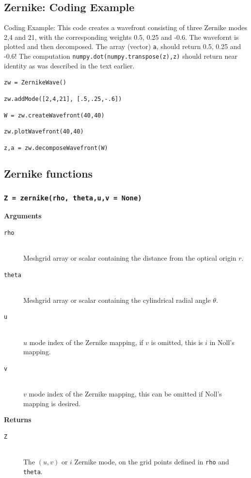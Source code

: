 \documentclass{article}
\begin{document}
\lstset{language=Python} 
\subsection{Zernike: Coding Example}
Coding Example: This code creates a wavefront consisting of three Zernike modes 2,4 and 21, with the corresponding weights 0.5, 0.25 and -0.6. The wavefornt is plotted and then decomposed. The array (vector) \texttt{a}, should return 0.5, 0.25 and -0.6! The computation \texttt{numpy.dot(numpy.transpose(z),z)} should return near identity as was described in the text earlier.

\texttt{zw = ZernikeWave()}

\texttt{zw.addMode([2,4,21], [.5,.25,-.6]) }

\texttt{W = zw.createWavefront(40,40)}

\texttt{zw.plotWavefront(40,40)}

\texttt{z,a = zw.decomposeWavefront(W)}

\newpage
\subsection{Zernike functions}
\subsubsection*{\texttt{Z = zernike(rho, theta,u,v = None)}}
\textbf{Arguments}
\begin{description}
\item[\texttt{rho}]\hfill \\
	Meshgrid array or scalar containing the distance from the optical origin $r$.
\item[\texttt{theta}]\hfill \\
 	Meshgrid array or scalar containing the cylindrical radial 	angle $\theta$. 
\item[\texttt{u}] \hfill \\
	$u$ mode index of the Zernike mapping, if $v$ is omitted, this is $i$ in Noll's mapping.
\item[\texttt{v}] \hfill \\
	 $v$ mode index of the Zernike mapping, this can be omitted if Noll's mapping is desired. 
\end{description}
\textbf{Returns}
\begin{description}
\item[\texttt{Z}] \hfill \\
 The $(u,v)$ or $i$ Zernike mode, on the grid points defined in \texttt{rho} and \texttt{theta}.
\end{description}
\end{document}
